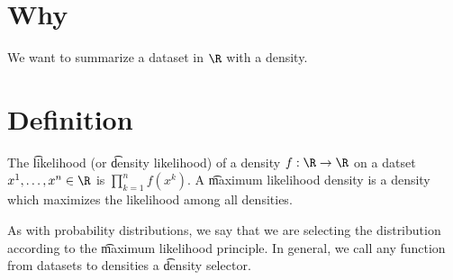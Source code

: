 

\section*{Why}

We want to summarize a dataset in $\R$ with a density.

\section*{Definition}

The \t{likelihood} (or \t{density likelihood}) of a density $f: \R  \to \R$ on a datset $x^1, \dots , x^n \in \R$ is $\prod_{k = 1}^{n} f(x^k)$.
A \t{maximum likelihood density} is a density which maximizes the likelihood among all densities.

As with probability distributions, we say that we are selecting the distribution according to the \t{maximum likelihood principle}.
In general, we call any function from datasets to densities a \t{density selector}.

\blankpage